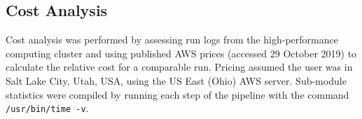 \documentclass[10pt, oneside]{article}
\begin{document}
\subsection*{Cost Analysis}
Cost analysis was performed by assessing run logs from the high-performance computing cluster and using published AWS prices \cite{aws_ec2, aws_s3} (accessed 29 October 2019) to calculate the relative cost for a comparable run. Pricing assumed the user was in Salt Lake City, Utah, USA, using the US East (Ohio) AWS server. Sub-module statistics were compiled by running each step of the pipeline with the command \texttt{/usr/bin/time -v}.\\



\end{document}
